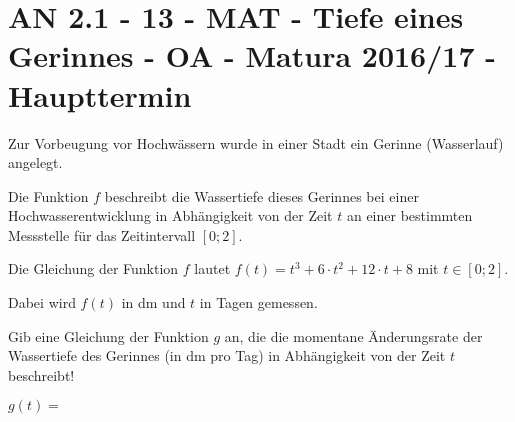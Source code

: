\section{AN 2.1 - 13 - MAT - Tiefe eines Gerinnes - OA - Matura 2016/17 - Haupttermin}

\begin{beispiel}[AN 2.1]{1} %
Zur Vorbeugung vor Hochwässern wurde in einer Stadt ein Gerinne (Wasserlauf) angelegt. \leer

Die Funktion $f$ beschreibt die Wassertiefe dieses Gerinnes bei einer Hochwasserentwicklung in
Abhängigkeit von der Zeit $t$ an einer bestimmten Messstelle für das Zeitintervall $[0; 2]$. \leer

Die Gleichung der Funktion $f$ lautet $f(t)=t^3+6\cdot t^2+12\cdot t +8$ mit $t\in [0; 2]$. \leer

Dabei wird $f(t)$ in dm und $t$ in Tagen gemessen. \leer

Gib eine Gleichung der Funktion $g$ an, die die momentane Änderungsrate der Wassertiefe
des Gerinnes (in dm pro Tag) in Abhängigkeit von der Zeit $t$ beschreibt! \leer

$g(t)=$  


\end{beispiel}